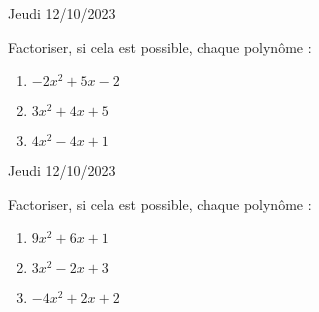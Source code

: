 \documentclass[a4paper,11pt,eval]{nsi}
\begin{document}
\textcolor{UGLiBlue}{Jeudi 12/10/2023}\\
\maketitle

Factoriser, si cela est possible, chaque polynôme :
\begin{multicols}{3}
    \begin{enumerate}
        \item $-2x^2+5x-2$
        \item $3x^2+4x+5$
        \item $4x^2-4x+1$
    \end{enumerate}
\end{multicols}


\textcolor{UGLiBlue}{Jeudi 12/10/2023}\\
\maketitle

Factoriser, si cela est possible, chaque polynôme :
\begin{multicols}{3}
    \begin{enumerate}
        \item $9x^2+6x+1$
        \item $3x^2-2x+3$
        \item $-4x^2+2x+2$
    \end{enumerate}
\end{multicols}
\end{document}
